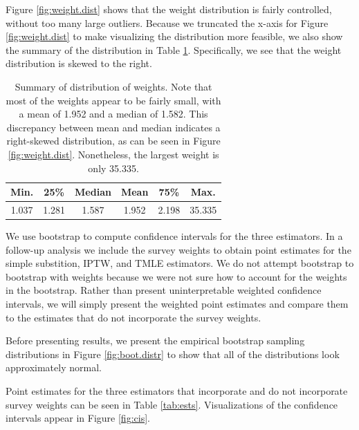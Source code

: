 \documentclass{article}
\begin{document}
Figure \ref{fig:weight.dist} shows that the weight distribution is fairly controlled, without too many large outliers. Because we truncated the x-axis for Figure \ref{fig:weight.dist} to make visualizing the distribution more feasible, we also show the summary of the distribution in Table \ref{tab:weight.summary}. Specifically, we see that the weight distribution is skewed to the right.

\begin{table}
\centering
\begin{tabular}{cccccc}
  \hline
 Min. & 25\% & Median & Mean & 75\% & Max. \\ 
  \hline
 1.037   & 1.281   & 1.587   & 1.952   &  2.198   &  35.335   \\ 
   \hline
\end{tabular}
\caption{Summary of distribution of weights. Note that most of the weights appear to be fairly small, with a mean of 1.952 and a median of 1.582. This discrepancy between mean and median indicates a right-skewed distribution, as can be seen in Figure \ref{fig:weight.dist}. Nonetheless, the largest weight is only 35.335.}
\label{tab:weight.summary}
\end{table}

We use bootstrap to compute confidence intervals for the three estimators. In a follow-up analysis we include the survey weights to obtain point estimates for the simple substition, IPTW, and TMLE estimators. We do not attempt bootstrap to bootstrap with weights because we were not sure how to account for the weights in the bootstrap. Rather than present uninterpretable weighted confidence intervals, we will simply present the weighted point estimates and compare them to the estimates that do not incorporate the survey weights.

Before presenting results, we present the empirical bootstrap sampling distributions in Figure \ref{fig:boot.distr} to show that all of the distributions look approximately normal.

Point estimates for the three estimators that incorporate and do not incorporate survey weights can be seen in Table \ref{tab:ests}. Visualizations of the confidence intervals appear in Figure \ref{fig:cis}.
\end{document}
